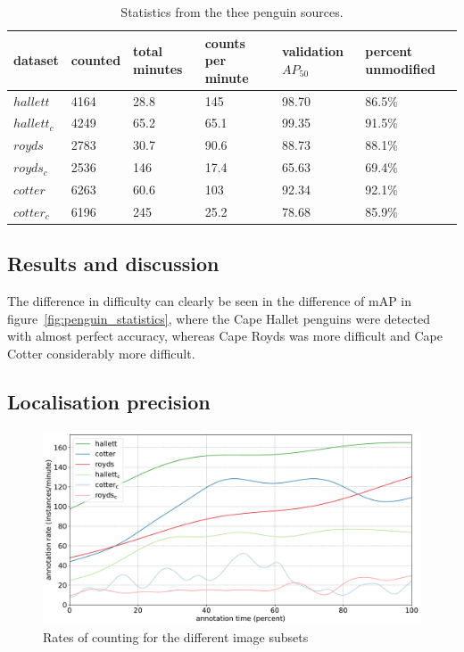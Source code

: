 \begin{table}[]
  \centering
    \caption{Statistics from the thee penguin sources. }
\begin{tabular}{llllll}
dataset     & counted & total minutes & counts per minute & validation $AP_{50}$ & percent unmodified \\
\toprule
$hallett$   & 4164    & 28.8          & 145               & 98.70     & 86.5\%   \\
$hallett_c$ & 4249    & 65.2          & 65.1              & 99.35     & 91.5\%   \\
$royds$     & 2783    & 30.7          & 90.6              & 88.73     & 88.1\%   \\
$royds_c$   & 2536    & 146           & 17.4              & 65.63     & 69.4\%   \\
$cotter$    & 6263    & 60.6          & 103               & 92.34     & 92.1\%   \\
$cotter_c$  & 6196    & 245           & 25.2              & 78.68     & 85.9\%  \\
\bottomrule
\end{tabular}
\end{table}





\subsection{Results and discussion}
 
The difference in difficulty can clearly be seen in the difference of mAP in figure~\ref{fig:penguin_statistics}, where the Cape Hallet penguins were detected with almost perfect accuracy, whereas Cape Royds was more difficult and Cape Cotter considerably more difficult. 

\subsection{ Localisation precision }
\label{sec:localisation_precision}

\begin{figure}[ht]
\centering
\includegraphics[width=1.0\linewidth]{charts/aerial_penguins/summaries/instance_rates.pdf}
\caption{ Rates of counting for the different image subsets }
\label{fig:penguin_rates}
\end{figure}



